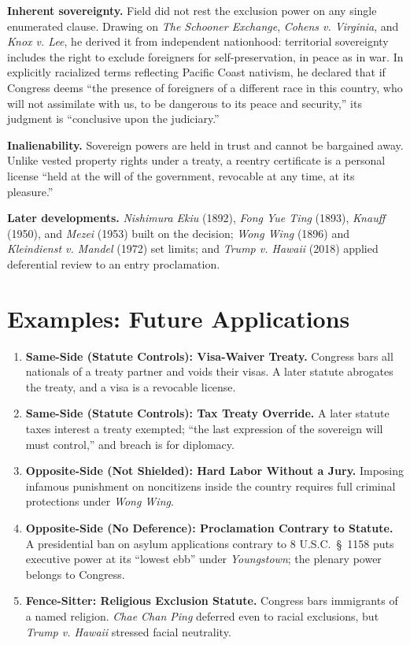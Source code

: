 \documentclass[12pt]{article}
\begin{document}
\textbf{Inherent sovereignty.} Field did not rest the exclusion power on any single enumerated clause. Drawing on \textit{The Schooner Exchange}, \textit{Cohens v. Virginia}, and \textit{Knox v. Lee}, he derived it from independent nationhood: territorial sovereignty includes the right to exclude foreigners for self-preservation, in peace as in war. In explicitly racialized terms reflecting Pacific Coast nativism, he declared that if Congress deems ``the presence of foreigners of a different race in this country, who will not assimilate with us, to be dangerous to its peace and security,'' its judgment is ``conclusive upon the judiciary.''

\textbf{Inalienability.} Sovereign powers are held in trust and cannot be bargained away. Unlike vested property rights under a treaty, a reentry certificate is a personal license ``held at the will of the government, revocable at any time, at its pleasure.''

\textbf{Later developments.} \textit{Nishimura Ekiu} (1892), \textit{Fong Yue Ting} (1893), \textit{Knauff} (1950), and \textit{Mezei} (1953) built on the decision; \textit{Wong Wing} (1896) and \textit{Kleindienst v. Mandel} (1972) set limits; and \textit{Trump v. Hawaii} (2018) applied deferential review to an entry proclamation.

\section{Examples: Future Applications}

\begin{enumerate}
\item \textbf{Same-Side (Statute Controls): Visa-Waiver Treaty.} Congress bars all nationals of a treaty partner and voids their visas. A later statute abrogates the treaty, and a visa is a revocable license.
\item \textbf{Same-Side (Statute Controls): Tax Treaty Override.} A later statute taxes interest a treaty exempted; ``the last expression of the sovereign will must control,'' and breach is for diplomacy.
\item \textbf{Opposite-Side (Not Shielded): Hard Labor Without a Jury.} Imposing infamous punishment on noncitizens inside the country requires full criminal protections under \textit{Wong Wing}.
\item \textbf{Opposite-Side (No Deference): Proclamation Contrary to Statute.} A presidential ban on asylum applications contrary to 8 U.S.C.\ \S\ 1158 puts executive power at its ``lowest ebb'' under \textit{Youngstown}; the plenary power belongs to Congress.
\item \textbf{Fence-Sitter: Religious Exclusion Statute.} Congress bars immigrants of a named religion. \textit{Chae Chan Ping} deferred even to racial exclusions, but \textit{Trump v. Hawaii} stressed facial neutrality.
\end{enumerate}
\end{document}
